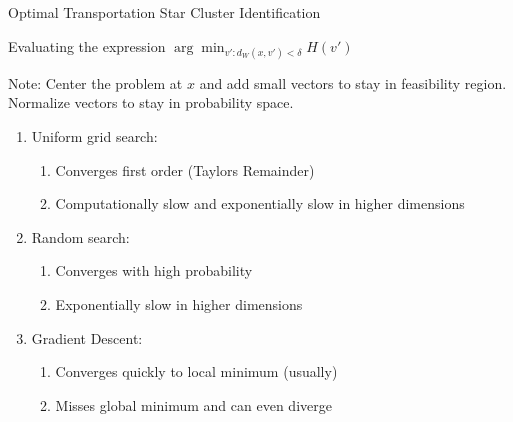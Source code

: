 \documentclass[10pt]{beamer}
\newcommand{\1}{{\mathbbm{1}}}
\begin{document}
\begin{frame}{Optimal Transportation Star Cluster Identification}

Evaluating the expression $\arg\min_{v':d_W(x,v')<\delta} H(v')$
\pause

Note: Center the problem at $x$ and add small vectors to stay in feasibility region. Normalize vectors to stay in probability space. \pause

\begin{enumerate}
    \item Uniform grid search: \pause
    
    \begin{enumerate}
        \item Converges first order (Taylors Remainder) \pause
        
        \item Computationally slow and exponentially slow in higher dimensions \pause
    \end{enumerate}
    
    \item Random search: \pause
    
    \begin{enumerate}
        \item Converges with high probability \pause
        
        \item Exponentially slow in higher dimensions \pause
    \end{enumerate}
    
    \item Gradient Descent: \pause
    
    \begin{enumerate}
        \item Converges quickly to local minimum (usually) \pause
        
        \item Misses global minimum and can even diverge
    \end{enumerate}
\end{enumerate}

\end{frame}
\end{document}
